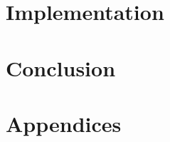\documentclass[12pt,a4paper]{article}
\begin{document}
\section{Implementation}

\pagebreak
\section*{Conclusion}
\citet{kazakovElkReasoner}
\citet{kazakovNominalsEL}
\citet{pukancovaAboxAbduction}
\citet{pukancovaPreliminaryReport}
\citet{harmelenHandbookKR}
\citet{greinerReitersCorrection}
\citet{wotawaReitersVariant}

\pagebreak
{}



\pagebreak
\section*{Appendices}
\end{document}
